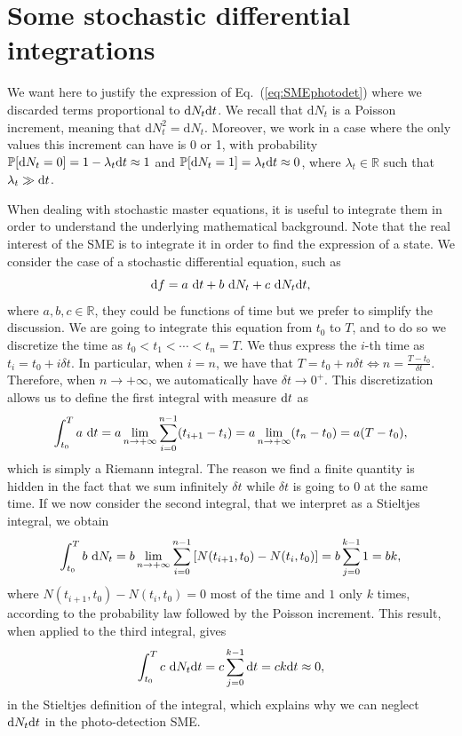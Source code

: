 \chapter{Some stochastic differential integrations}\label{ann:stieltjes}
We want here to justify the expression of Eq.~(\ref{eq:SMEphotodet}) where we discarded terms proportional to $\mathrm{d}N_t \mathrm{d}t$. We recall that $\mathrm{d}N_t$ is a Poisson increment, meaning that $\mathrm{d}N_t^2 = \mathrm{d}N_t$. Moreover, we work in a case where the only values this increment can have is 0 or 1, with probability $\mathbb{P}\qty[\mathrm{d}N_t=0] = 1-\lambda_t \mathrm{d}t\approx 1$ and $\mathbb{P}\qty[\mathrm{d}N_t=1] = \lambda_t \mathrm{d}t\approx 0$, where $\lambda_t\in\mathbb{R}$ such that $\lambda_t\gg \mathrm{d}t$.

When dealing with stochastic master equations, it is useful to integrate them in order to understand the underlying mathematical background. Note that the real interest of the SME is to integrate it in order to find the expression of a state. We consider the case of a stochastic differential equation, such as
\begin{equation}
    \mathrm{d}f = a~\mathrm{d}t + b~\mathrm{d}N_t + c~\mathrm{d}N_t\mathrm{d}t,
\end{equation}
where $a,b,c\in\mathbb{R}$, they could be functions of time but we prefer to simplify the discussion. We are going to integrate this equation from $t_0$ to $T$, and to do so we discretize the time as $t_0<t_1<\cdots<t_n=T$. We thus express the $i$-th time as $t_i = t_0+i\delta t$. In particular, when $i=n$, we have that $T=t_0+n\delta t \Leftrightarrow n = \frac{T-t_0}{\delta t}$. Therefore, when $n\rightarrow +\infty$, we automatically have $\delta t\rightarrow 0^+$. This discretization allows us to define the first integral with measure $\mathrm{d}t$ as
\begin{equation}
    \int_{t_0}^T a~\mathrm{d}t = a \lim_{n\rightarrow +\infty} \sum_{i=0}^{n-1} (t_{i+1}-t_i) = a \lim_{n\rightarrow +\infty} (t_n-t_0) = a (T-t_0),
\end{equation}
which is simply a Riemann integral. The reason we find a finite quantity is hidden in the fact that we sum infinitely $\delta t$ while $\delta t$ is going to 0 at the same time. If we now consider the second integral, that we interpret as a Stieltjes integral, we obtain
\begin{equation}
    \int_{t_0}^T b~\mathrm{d}N_t = b \lim_{n\rightarrow +\infty} \sum_{i=0}^{n-1}\qty[N(t_{i+1},t_0)-N(t_i,t_0)] = b \sum_{j=0}^{k-1} 1 = bk,
\end{equation}
where $N(t_{i+1},t_0)-N(t_i,t_0)=0$ most of the time and $1$ only $k$ times, according to the probability law followed by the Poisson increment. This result, when applied to the third integral, gives 
\begin{equation}
    \int_{t_0}^T c~\mathrm{d}N_t\mathrm{d}t = c \sum_{j=0}^{k-1}\mathrm{d}t=c k \mathrm{d}t\approx 0,
\end{equation}
in the Stieltjes definition of the integral, which explains why we can neglect $\mathrm{d}N_t\mathrm{d}t$ in the photo-detection SME. 